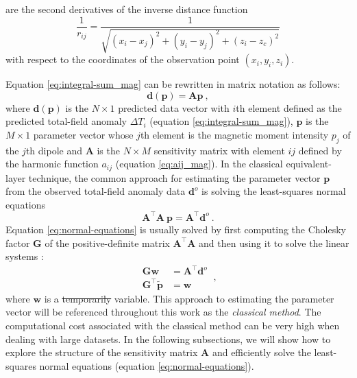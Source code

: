 \documentclass[manuscript]{geophysics}
\providecommand{\DIFaddtex}[1]{{\protect\color{blue}\uwave{#1}}} %
\providecommand{\DIFdeltex}[1]{{\protect\color{red}\sout{#1}}}                      %
\providecommand{\DIFaddbegin}{} %
\providecommand{\DIFaddend}{} %
\providecommand{\DIFdelbegin}{} %
\providecommand{\DIFdelend}{} %
\providecommand{\DIFadd}[1]{\texorpdfstring{\DIFaddtex{#1}}{#1}} %
\providecommand{\DIFdel}[1]{\texorpdfstring{\DIFdeltex{#1}}{}} %
\begin{document}
are the second derivatives of the inverse distance function
\begin{equation}
	\frac{1}{r_{ij}} = 
	\frac{1}{\sqrt{\left(x_{i} - x_{j} \right)^{2} + 
			\left(y_{i} - y_{j} \right)^{2} + \left(z_{i} - z_{c} \right)^{2}}}
	\label{eq:1_rij}
\end{equation}
with respect to the coordinates of the observation point $(x_{i}, y_{i}, z_{i})$.

Equation \ref{eq:integral-sum_mag} can be rewritten in matrix notation as follows:
\begin{equation}
	\mathbf{d}(\mathbf{p}) = \mathbf{A} \mathbf{p} \: ,
	\label{eq:predicted-data-vector_mag}
\end{equation}
where $\mathbf{d}(\mathbf{p})$ is the $N \times 1$ predicted data vector with $i$th element defined
as the predicted total-field anomaly $\Delta T_{i}$ (equation \ref{eq:integral-sum_mag}),
$\mathbf{p}$ is the $M \times 1$ parameter vector whose $j$th element is the magnetic moment intensity
$p_{j}$ of the $j$th dipole and $\mathbf{A}$ is the $N \times M$ sensitivity matrix with element 
$ij$ defined by the harmonic function $a_{ij}$ (equation \ref{eq:aij_mag}).
In the classical equivalent-layer technique, the common approach for 
estimating the parameter vector $\mathbf{p}$ from the observed 
total-field anomaly data $\mathbf{d}^{o}$ is solving the least-squares normal equations
\begin{equation}
	\mathbf{A}^{\top}\mathbf{A} \: \mathbf{p} = 
	\mathbf{A}^{\top} \mathbf{d}^{o} \: .
	\label{eq:normal-equations}
\end{equation}
Equation \ref{eq:normal-equations} is usually solved by first computing the Cholesky 
factor $\mathbf{G}$ of the positive-definite matrix $\mathbf{A}^{\top}\mathbf{A}$ and then using it to solve the linear 
systems \citep[][ p. 262]{golub-vanloan2013}:
\begin{equation}
	\begin{split}
		\mathbf{G} \mathbf{w} &= \mathbf{A}^{\top}\mathbf{d}^{o} \\
		\mathbf{G}^{\top} \tilde{\mathbf{p}} &= \mathbf{w}
	\end{split} \: ,
	\label{eq:classical-method}
\end{equation}
where $\mathbf{w}$ is a \DIFdelbegin \DIFdel{temporarily }\DIFdelend \DIFaddbegin \DIFadd{temporary }\DIFaddend variable.
This approach to estimating the parameter vector will be 
referenced throughout this work as the \textit{classical method}.
The computational cost associated with the classical method can be very high
when dealing with large datasets. In the following subsections, we will show how to 
explore the structure of the sensitivity matrix $\mathbf{A}$ and 
efficiently solve the least-squares normal equations (equation \ref{eq:normal-equations}).
\end{document}

